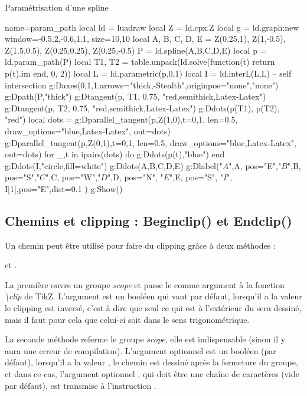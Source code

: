 \begin{demo}{Paramétrisation d'une spline}
\begin{luadraw}{name=param_path}
local ld = luadraw
local Z = ld.cpx.Z
local g = ld.graph:new{ window={-0.5,2,-0.6,1.1}, size={10,10}}
local A, B, C, D, E = Z(0.25,1), Z(1,-0.5), Z(1.5,0.5), Z(0.25,0.25), Z(0.25,-0.5)
P = ld.spline({A,B,C,D,E})
local p = ld.param_path(P)
local T1, T2 = table.unpack(ld.solve(function(t) return p(t).im end, 0, 2))
local L = ld.parametric(p,0,1)
local I = ld.interL(L,L) -- self intersection
g:Daxes({0,1,1},{arrows="thick,-Stealth",originpos={"none","none"}})
g:Dpath(P,"thick")
g:Dtangent(p, T1, 0.75, "red,semithick,Latex-Latex")
g:Dtangent(p, T2, 0.75, "red,semithick,Latex-Latex")
g:Ddots({p(T1), p(T2)}, "red")
local dots = {}
g:Dparallel_tangent(p,Z(1,0),{t={0,1}, len=0.5, draw_options="blue,Latex-Latex", out=dots})
g:Dparallel_tangent(p,Z(0,1),{t={0,1}, len=0.5, draw_options="blue,Latex-Latex", out=dots})
for _,t in ipairs(dots) do g:Ddots(p(t),"blue") end
g:Ddots(I,"circle,fill=white")
g:Ddots({A,B,C,D,E})
g:Dlabel("$A$",A, {pos="E"},"$B$",B, {pos="S"},"$C$",C, {pos="W"},"$D$",D, {pos="N"},
"$E$",E, {pos="S"}, "$I$", I[1],{pos="E",dist=0.1} )
g:Show()
\end{luadraw}
\end{demo}

\subsection{Chemins et clipping : Beginclip() et Endclip()}

Un chemin peut être utilisé pour faire du clipping grâce à deux méthodes : \par
\hfil {} et .\hfil

La première ouvre un groupe \emph{scope} et passe le  comme argument à la fonction \emph{\textbackslash clip} de TikZ. L'argument  est un booléen qui vaut \false par défaut, lorsqu'il a la valeur \true le clipping est inversé, c'est à dire que seul ce qui est à l'extérieur du  sera dessiné, mais il faut pour cela que celui-ci soit dans le sens trigonométrique.
 
La seconde méthode referme le groupe \emph{scope}, elle est indispensable (sinon il y aura une erreur de compilation). L'argument optionnel  est un booléen (\false par défaut), lorsqu'il a la valeur \true, le chemin  est dessiné après la fermeture du groupe, et dans ce cas, l'argument optionnel , qui doit être une chaîne de caractères (vide par défaut), est transmise à l'instruction \drawcmd.

